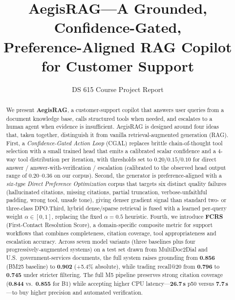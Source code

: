 \documentclass[11pt,a4paper,twocolumn]{article}
\title{\vspace{-1.0cm}\textbf{AegisRAG---A Grounded, Confidence-Gated,\\
Preference-Aligned RAG Copilot for Customer Support}}
\author{
DS 615 Course Project Report
}
\date{}
\begin{document}
\sloppy
\twocolumn[\maketitle
\vspace{0.6em}]

\begin{abstract}
We present \textbf{AegisRAG}, a customer-support copilot that answers user
queries from a document knowledge base, calls structured tools when needed,
and escalates to a human agent when evidence is insufficient. AegisRAG is
designed around four ideas that, taken together, distinguish it from vanilla
retrieval-augmented generation (RAG). First, a \emph{Confidence-Gated Action
Loop} (CGAL) replaces brittle chain-of-thought tool selection with a small
trained head that emits a calibrated scalar confidence and a 4-way tool
distribution per iteration, with thresholds set to $0.20/0.15/0.10$ for
direct answer / answer-with-verification / escalation (calibrated to the
observed head output range of $0.20$--$0.36$ on our corpus). Second, the generator is preference-aligned with
a \emph{six-type Direct Preference Optimization} corpus that targets six
distinct quality failures (hallucinated citations, missing citations, partial
truncation, verbose-unfaithful padding, wrong tool, unsafe tone), giving
denser gradient signal than standard two- or three-class DPO.\@ Third, hybrid
dense/sparse retrieval is fused with a learned per-query weight
$\alpha\in[0,1]$, replacing the fixed $\alpha=0.5$ heuristic. Fourth, we
introduce \textbf{FCRS} (First-Contact Resolution Score), a domain-specific
composite metric for support workflows that combines completeness, citation
coverage, tool appropriateness and escalation accuracy. Across seven model
variants (three baselines plus four progressively-augmented systems) on a
test set drawn from MultiDoc2Dial and U.S.\ government-services documents,
the full system raises grounding from \textbf{0.856} (BM25 baseline) to
\textbf{0.902} (+5.4\% absolute), while trading recall@20 from
\textbf{0.796} to \textbf{0.745} under stricter filtering. The full M5
pipeline preserves strong citation coverage (\textbf{0.844} vs.\ \textbf{0.855}
for B1) while accepting higher CPU latency---\textbf{26.7\,s} p50 versus
\textbf{7.7\,s}---to buy higher precision and automated verification.
\end{abstract}

\end{document}
